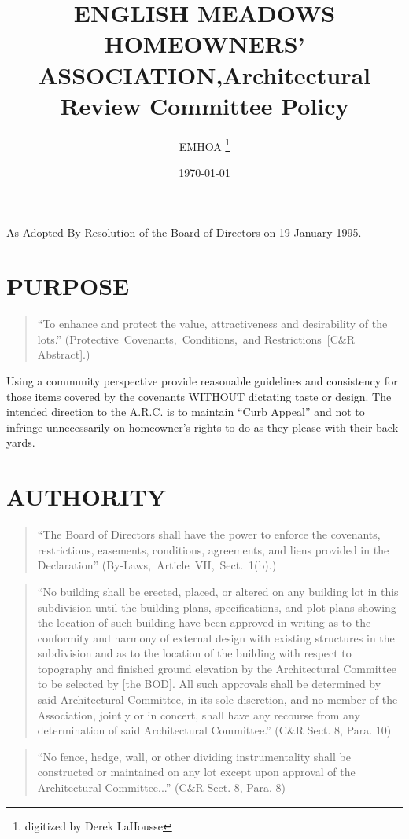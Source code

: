 \documentclass[10pt, letterpaper]{article}
\title{ENGLISH MEADOWS HOMEOWNERS' ASSOCIATION,\linebreak[0] Architectural Review Committee Policy}
\author{EMHOA \thanks{digitized by Derek LaHousse}}
\date{\today}
\begin{document}
\maketitle

As Adopted By Resolution of the Board of Directors on 19 January 1995.

\section{PURPOSE}
\begin{quote}
  ``To enhance and protect the value, attractiveness and desirability of the lots.''
  \hfill (Protective~Covenants,~Conditions,~and Restrictions~[C\&R Abstract].)
\end{quote}
Using a community perspective provide reasonable guidelines and consistency for those items covered by the covenants WITHOUT dictating taste or design.
The intended direction to the A.R.C. is to maintain ``Curb Appeal'' and not to infringe unnecessarily on homeowner's rights to do as they please with their back yards.

\section{AUTHORITY}
\begin{quote}
  ``The Board of Directors shall have the power to enforce the covenants, restrictions, easements, conditions, agreements, and liens provided in the Declaration''
  \hfill (By-Laws,~Article~VII,~Sect.~1(b).)
\end{quote}
\begin{quote}
  ``No building shall be erected, placed, or altered on any building lot in this subdivision until the building plans, specifications, and plot plans showing the location of such building have been approved in writing as to the conformity and harmony of external design with existing structures in the subdivision and as to the location of the building with respect to topography and finished ground elevation by the Architectural Committee to be selected by [the BOD].
  All such approvals shall be determined by said Architectural Committee, in its sole discretion, and no member of the Association, jointly or in concert, shall have any recourse from any determination of said Architectural Committee.''
  \hfill (C\&R Sect. 8, Para. 10)
\end{quote}
\begin{quote}
  ``No fence, hedge, wall, or other dividing instrumentality shall be constructed or maintained on any lot except upon approval of the Architectural Committee...''
  \hfill (C\&R Sect. 8, Para. 8)
\end{quote}
\end{document}

